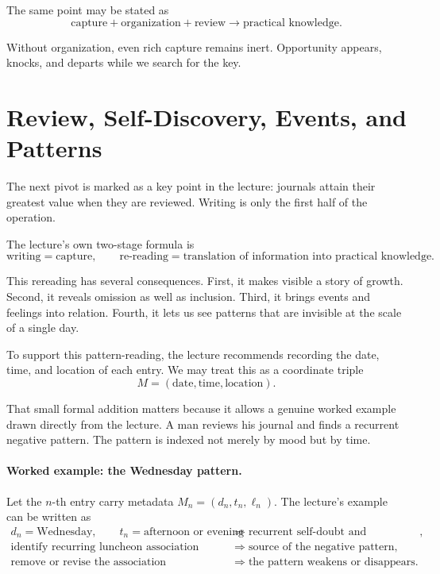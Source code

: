 The same point may be stated as
\begin{equation}
\text{capture}+\text{organization}+\text{review}\rightarrow \text{practical knowledge}.
\end{equation}

Without organization, even rich capture remains inert. Opportunity appears, knocks, and departs while we search for the key.

\section{Review, Self-Discovery, Events, and Patterns}

The next pivot is marked as a key point in the lecture: journals attain their greatest value when they are reviewed. Writing is only the first half of the operation.

The lecture's own two-stage formula is
\begin{equation}
\text{writing}=\text{capture},\qquad
\text{re-reading}=\text{translation of information into practical knowledge}.
\end{equation}

This rereading has several consequences. First, it makes visible a story of growth. Second, it reveals omission as well as inclusion. Third, it brings events and feelings into relation. Fourth, it lets us see patterns that are invisible at the scale of a single day.

To support this pattern-reading, the lecture recommends recording the date, time, and location of each entry. We may treat this as a coordinate triple
\begin{equation}
M=(\text{date},\text{time},\text{location}).
\end{equation}

That small formal addition matters because it allows a genuine worked example drawn directly from the lecture. A man reviews his journal and finds a recurrent negative pattern. The pattern is indexed not merely by mood but by time.

\paragraph{Worked example: the Wednesday pattern.}
Let the \(n\)-th entry carry metadata \(M_n=(d_n,t_n,\ell_n)\). The lecture's example can be written as
\begin{align}
d_n=\text{Wednesday},\qquad t_n=\text{afternoon or evening}
&\Longrightarrow \text{recurrent self-doubt and discouragement},\\
\text{identify recurring luncheon association}
&\Longrightarrow \text{source of the negative pattern},\\
\text{remove or revise the association}
&\Longrightarrow \text{the pattern weakens or disappears}.
\end{align}

